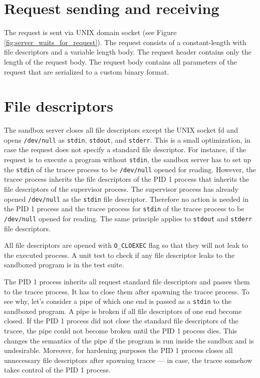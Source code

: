\documentclass[en]{pracamgr}
\begin{document}
\section{Request sending and receiving}

The request is sent via UNIX domain socket (see Figure \ref{fig:server_waits_for_request}). The request consists of a constant-length with file descriptors and a variable length body. The request header contains only the length of the request body. The request body contains all parameters of the request that are serialized to a custom binary format.

\section{File descriptors}

The sandbox server closes all file descriptors except the UNIX socket fd and opens \texttt{/dev/null} as \texttt{stdin}, \texttt{stdout}, and \texttt{stderr}. This is a small optimization, in case the request does not specify a standard file descriptor. For instance, if the request is to execute a program without \texttt{stdin}, the sandbox server has to set up the \texttt{stdin} of the tracee process to be \texttt{/dev/null} opened for reading. However, the tracee process inherits the file descriptors of the PID 1 process that inherits the file descriptors of the supervisor process. The supervisor process has already opened \texttt{/dev/null} as the \texttt{stdin} file descriptor. Therefore no action is needed in the PID 1 process and the tracee process for \texttt{stdin} of the tracee process to be \texttt{/dev/null} opened for reading. The same principle applies to \texttt{stdout} and \texttt{stderr} file descriptors.

All file descriptors are opened with \texttt{O\_CLOEXEC} flag so that they will not leak to the executed process. A unit test to check if any file descriptor leaks to the sandboxed program is in the test suite.

The PID 1 process inherits all request standard file descriptors and passes them to the tracee process. It has to close them after spawning the tracee process. To see why, let's consider a pipe of which one end is passed as a \texttt{stdin} to the sandboxed program. A pipe is broken if all file descriptors of one end become closed. If the PID 1 process did not close the standard file descriptors of the tracee, the pipe could not become broken until the PID 1 process dies. This changes the semantics of the pipe if the program is run inside the sandbox and is undesirable. Moreover, for hardening purposes the PID 1 process closes all unnecessary file descriptors after spawning tracee --- in case, the tracee somehow takes control of the PID 1 process.
\end{document}
